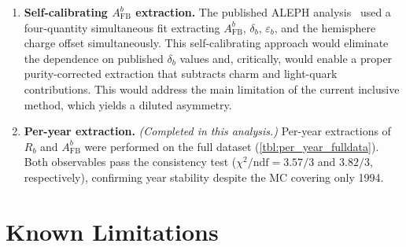 \documentclass[11pt,a4paper]{article}
\begin{document}
\begin{enumerate}
\item \textbf{Self-calibrating $A_\text{FB}^b$ extraction.}
  The published ALEPH analysis~\cite{ALEPH:AFBb} used a
  four-quantity simultaneous fit extracting $A_\text{FB}^b$,
  $\delta_b$, $\varepsilon_b$, and the hemisphere charge offset
  simultaneously.
  This self-calibrating approach would eliminate the dependence
  on published $\delta_b$ values and, critically, would enable
  a proper purity-corrected extraction that subtracts charm and
  light-quark contributions.
  This would address the main limitation of the current inclusive
  method, which yields a diluted asymmetry.

\item \textbf{Per-year extraction.}
  \textit{(Completed in this analysis.)}
  Per-year extractions of $R_b$ and $A_\text{FB}^b$ were performed
  on the full dataset (\cref{tbl:per_year_fulldata}).
  Both observables pass the consistency test
  ($\chi^2/\text{ndf} = 3.57/3$ and $3.82/3$, respectively),
  confirming year stability despite the MC covering only 1994.
\end{enumerate}

\section{Known Limitations}
\label{sec:limitations}
\end{document}
